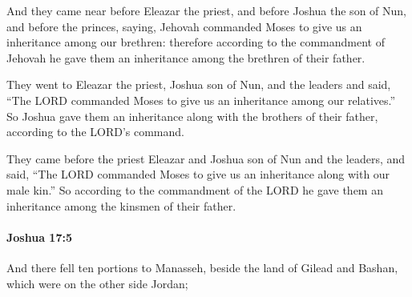 			\begin{versebox}
					\item[BHS] 
					\item[ASV] And they came near before Eleazar the priest, and before Joshua the son of Nun, and before the princes, saying, Jehovah commanded Moses to give us an inheritance among our brethren: therefore according to the commandment of Jehovah he gave them an inheritance among the brethren of their father.
					\item[NIV] They went to Eleazar the priest, Joshua son of Nun, and the leaders and said, “The LORD commanded Moses to give us an inheritance among our relatives.” So Joshua gave them an inheritance along with the brothers of their father, according to the LORD’s command.
					\item[NRSV] They came before the priest Eleazar and Joshua son of Nun and the leaders, and said, “The LORD commanded Moses to give us an inheritance along with our male kin.” So according to the commandment of the LORD he gave them an inheritance among the kinsmen of their father.
			\end{versebox}

		\paragraph{Joshua 17:5} %
			\label{JOSHUA-17-5}

			And there fell ten portions to Manasseh, beside the land of Gilead and Bashan, which were on the other side Jordan;


